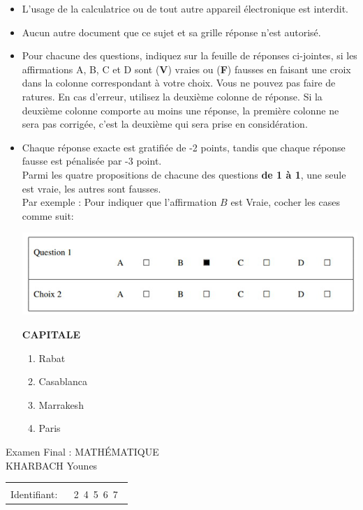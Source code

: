 \documentclass{book}%
\begin{document}
\begin{itemize}%
\item%
L'usage de la calculatrice ou de tout autre appareil électronique est interdit.%
\item%
Aucun autre document que ce sujet et sa grille réponse n'est autorisé.%
\item%
Pour chacune des questions, indiquez sur la feuille de réponses ci-jointes, si les affirmations A, B, C et D sont (\textbf{V}) vraies ou (\textbf{F}) fausses en faisant une croix dans la colonne correspondant à votre choix. Vous ne pouvez pas faire de ratures. En cas d'erreur, utilisez la deuxième colonne de réponse. Si la deuxième colonne comporte au moins une réponse, la première colonne ne sera pas corrigée, c'est la deuxième qui sera prise en considération.%
\item%
Chaque réponse exacte est gratifiée de -2 points, tandis que chaque réponse fausse est pénalisée par -3 point. \\ 	Parmi les quatre propositions de chacune des questions \textbf{de 1 à 1}, une seule est vraie, les autres sont fausses. \\ 	Par exemple : Pour indiquer que l'affirmation $B$ est Vraie, cocher les cases comme suit:  \\ \begin{center}	\includegraphics[scale=0.8]{reponses.png} \end{center}%
\thispagestyle{empty}%
\begin{exercise}%
\textbf{CAPITALE }%
\begin{enumerate}[label=\textbf{\Alph*. }]%
\item%
Rabat%
\item%
Casablanca%
\item%
Marrakesh%
\item%
Paris%
\end{enumerate}%
\end{exercise}%
\end{itemize}%
\newpage%
\thispagestyle{empty}%
Examen Final : MATHÉMATIQUE $\qquad \qquad \qquad \qquad \qquad \qquad \qquad \qquad$ KHARBACH Younes%
\begin{flushright}%
\begin{tabular}{|l|}%
\hline%
 \\%
\thispagestyle{empty}%
Identifiant: $\quad$ {\Large 2~4~5~6~7~}%
 \\%
\hline%
\end{tabular}%
\end{flushright}%
\end{document}

